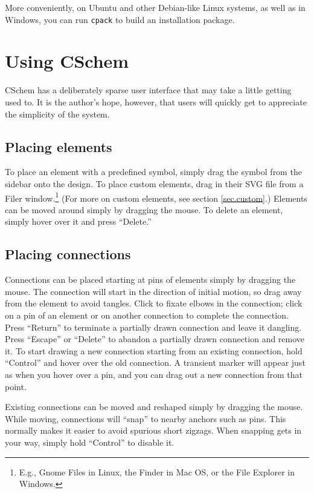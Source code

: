 \documentclass[11pt]{report}
\def\terminal#1{{\tt#1}}
\begin{document}
More conveniently, on Ubuntu and other Debian-like Linux systems, as
well as in Windows, you can run \terminal{cpack} to build an
installation package.

\chapter{Using CSchem}

CSchem has a deliberately sparse user interface that may take a little
getting used to. It is the author's hope, however, that users will
quickly get to appreciate the simplicity of the system.

\section{Placing elements}

To place an element with a predefined symbol, simply drag the symbol
from the sidebar onto the design. To place custom elements, drag in
their SVG file from a Filer window.\footnote{E.g., Gnome Files in
  Linux, the Finder in Mac OS, or the File Explorer in Windows.} (For
more on custom elements, see section \ref{sec.custom}.) Elements can
be moved around simply by dragging the mouse. To delete an element,
simply hover over it and press ``Delete.''

\section{Placing connections}

Connections can be placed starting at pins of elements simply by
dragging the mouse. The connection will start in the direction of
initial motion, so drag away from the element to avoid tangles. Click
to fixate elbows in the connection; click on a pin of an element or on
another connection to complete the connection. Press ``Return'' to
terminate a partially drawn connection and leave it dangling. Press
``Escape'' or ``Delete'' to abandon a partially drawn connection and
remove it. To start drawing a new connection starting from an existing
connection, hold ``Control'' and hover over the old connection. A
transient marker will appear just as when you hover over a pin, and
you can drag out a new connection from that point.

Existing connections can be
moved and reshaped simply by dragging the mouse. While moving,
connections will ``snap'' to nearby anchors such as pins. This
normally makes it easier to avoid spurious short zigzags. When
snapping gets in your way, simply hold ``Control'' to disable it.
\end{document}
